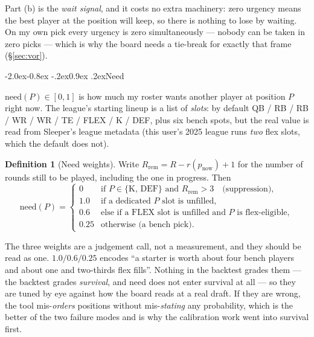 \documentclass[10pt,a4paper]{article}
\makeatletter
\theoremstyle{plain}
\theoremstyle{definition}
\newtheorem{definition}[theorem]{Definition}
\theoremstyle{remark}
\renewcommand\subsection{\@startsection{subsection}{2}{\z@}%
  {-2.0ex\@plus -0.8ex \@minus -.2ex}{0.9ex \@plus .2ex}{\normalfont\large\bfseries}}
\makeatother
\begin{document}
Part (b) is the \emph{wait signal}, and it costs no extra machinery: zero urgency means
the best player at the position will keep, so there is nothing to lose by waiting. On my
own pick every urgency is zero simultaneously --- nobody can be taken in zero picks ---
which is why the board needs a tie-break for exactly that frame (\S\ref{sec:vor}).

\subsection{Need}

$\mathrm{need}(P) \in [0,1]$ is how much my roster wants another player at position $P$
right now. The league's starting lineup is a list of \emph{slots}: by default
QB / RB / RB / WR / WR / TE / FLEX / K / DEF, plus six bench spots, but the real value is
read from Sleeper's league metadata (this user's 2025 league runs \emph{two} flex slots,
which the default does not).

\begin{definition}[Need weights]
Write $R_{\text{rem}} = R - r(p_{\text{now}}) + 1$ for the number of rounds still to be
played, including the one in progress. Then
\begin{equation}
\mathrm{need}(P) =
\begin{cases}
0     & \text{if $P \in \{$K, DEF$\}$ and $R_{\text{rem}} > 3$} \quad \text{(suppression)},\\
1.0   & \text{if a dedicated $P$ slot is unfilled},\\
0.6   & \text{else if a FLEX slot is unfilled and $P$ is flex-eligible},\\
0.25  & \text{otherwise (a bench pick)}.
\end{cases}
\label{eq:need}
\end{equation}
\end{definition}

The three weights are a judgement call, not a measurement, and they should be read as
one. $1.0 / 0.6 / 0.25$ encodes ``a starter is worth about four bench players and about
one and two-thirds flex fills''. Nothing in the backtest grades them --- the backtest
grades \emph{survival}, and need does not enter survival at all --- so they are tuned by
eye against how the board reads at a real draft. If they are wrong, the tool
mis-\emph{orders} positions without mis-\emph{stating} any probability, which is the
better of the two failure modes and is why the calibration work went into survival
first.
\end{document}
